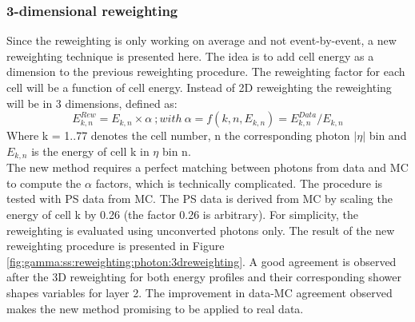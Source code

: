 \subsubsection{3-dimensional reweighting}
Since the reweighting is only working on average and not event-by-event, a new reweighting technique is presented here. The idea is to add cell energy as a dimension to the previous reweighting procedure. The reweighting factor for each cell will be a function of cell energy. Instead of 2D reweighting the reweighting will be in 3 dimensions, defined as:
\begin{equation}
    E_{k,n}^{Rew} = E_{k,n} \times \alpha \ ; with \ \alpha = f(k,n,E_{k,n}) = E_{k,n}^{Data}/E_{k,n}
\end{equation}
Where k = 1..77 denotes the cell number, n the corresponding photon $|\eta|$ bin and $E_{k,n}$ is the energy of cell k in $\eta$ bin n. \\
The new method requires a perfect matching between photons from data and MC to compute the $\alpha$ factors, which is technically complicated. The procedure is tested with PS data from MC. The PS data is derived from MC by scaling the energy of cell k by 0.26 (the factor 0.26 is arbitrary). For simplicity, the reweighting is evaluated using unconverted photons only.
The result of the new reweighting procedure is presented in Figure \ref{fig:gamma:ss:reweighting:photon:3dreweighting}. A good agreement is observed after the 3D reweighting for both energy profiles and their corresponding shower shapes variables for layer 2. The improvement in data-MC agreement observed makes the new method promising to be applied to real data.
